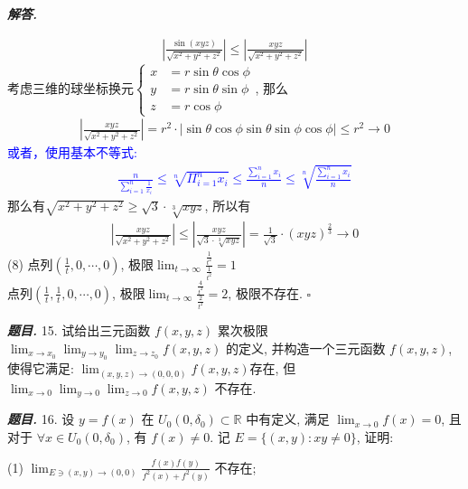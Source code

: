 \documentclass[10pt, a4paper, oneside]{ctexart}
\newenvironment{problem}{\begin{framed}\par\noindent\textbf{\textit{题目. }}}{\end{framed}\par}
\newenvironment{solution}{%
  \par\noindent\textbf{\textit{解答. }}\ignorespaces
}{%
  \hfill\ensuremath{\square}\par %
}
\begin{document}
\begin{solution}
\begin{align*}
    |\frac{\sin(xyz)}{\sqrt{x^2+y^2+z^2}}|\leq |\frac{xyz}{\sqrt{x^2+y^2+z^2}}|
\end{align*}
考虑三维的球坐标换元$\begin{cases}
    x&=r\sin \theta\cos \phi\\
    y&=r \sin \theta \sin \phi\\
    z&= r\cos \phi
\end{cases}$, 那么
\begin{align*}
    |\frac{xyz}{\sqrt{x^2+y^2+z^2}}|=r^2\cdot|\sin\theta\cos \phi \sin \theta \sin \phi\cos \phi|\leq r^2 \to 0
\end{align*}
\textcolor{blue}{或者，使用基本不等式:
\begin{align*}
\frac{n}{\sum_{i=1}^n \frac{1}{x_i}}\leq \sqrt[n]{\Pi_{i=1}^n x_i}\leq \frac{\sum_{i=1}^n x_i}{n} \leq \sqrt[n]{\frac{\sum_{i=1}^n x_i}{n}}
\end{align*} }
那么有$\sqrt{x^2+y^2+z^2}\geq \sqrt{3}\cdot \sqrt[3]{xyz}$, 所以有
\begin{align*}
    |\frac{xyz}{\sqrt{x^2+y^2+z^2}}|\leq |\frac{xyz}{\sqrt{3}\cdot \sqrt[3]{xyz}}|=\frac{1}{\sqrt{3}}\cdot (xyz)^{\frac{2}{3}}\to 0
\end{align*}
(8) 点列$(\frac{1}{t},0,\cdots,0)$, 极限$\lim_{t\to \infty}\frac{\frac{1}{t^2}}{\frac{1}{t^2}}=1$\\点列$(\frac{1}{t},\frac{1}{t}, 0,\cdots,0)$, 极限$\lim_{t\to \infty}\frac{\frac{4}{t^2}}{\frac{2}{t^2}}=2$, 极限不存在.
\end{solution}


\begin{problem}
15. 试给出三元函数 $f(x, y, z)$ 累次极限 $\lim _{x \rightarrow x_0} \lim _{y \rightarrow y_0} \lim _{z \rightarrow z_0} f(x, y, z)$ 的定义, 并构造一个三元函数 $f(x, y, z)$, 使得它满足: $\lim _{(x, y, z) \rightarrow(0,0,0)} f(x, y, z)$存在, 但 $\lim _{x \rightarrow 0} \lim _{y \rightarrow 0} \lim _{z \rightarrow 0} f(x, y, z)$ 不存在.
\end{problem}

\begin{problem}
16. 设 $y=f(x)$ 在 $U_0\left(0, \delta_0\right) \subset \mathbb{R}$ 中有定义, 满足 $\lim _{x \rightarrow 0} f(x)=0$, 且对于 $\forall x \in U_0\left(0, \delta_0\right)$, 有 $f(x) \neq 0$. 记 $E=\{(x, y): x y \neq 0\}$, 证明:

(1) $\lim _{E \ni(x, y) \rightarrow(0,0)} \frac{f(x) f(y)}{f^2(x)+f^2(y)}$ 不存在;
\end{problem}
\end{document}
